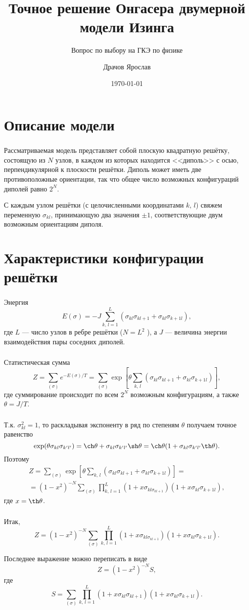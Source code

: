 \documentclass[c]{beamer}
\title{Точное решение Онгасера двумерной модели Изинга}
\subtitle{Вопрос по выбору на ГКЭ по физике}
\author{Драчов Ярослав}
\date{\today}
\institute[МФТИ]{Московский физико-технический институт}
\begin{document}
\frame[plain]{\titlepage}
\section{Описание модели}
\begin{frame}
\frametitle{\insertsection}
Рассматриваемая модель представляет собой плоскую квадратную
решётку, состоящую из $N$ узлов, в каждом из которых находится
<<диполь>> с осью, перпендикулярной к плоскости решётки. Диполь
может иметь две противоположные ориентации, так что общее
число возможных конфигураций диполей равно $2^N$.

С каждым узлом решётки (с целочисленными координатами $k,\,l$)
свяжем переменную $\sigma_{kl}$, принимающую два значения
$\pm 1$, соответствующие двум возможным ориентациям диполя.
\end{frame}
\section{Характеристики конфигурации решётки}
\begin{frame}
\frametitle{\insertsection}
\begin{block}{Энергия}
\[
	E(\sigma)= -J \sum_{k,\,l=1}^{L} \left(\sigma_{kl}\sigma_{kl+1}
	+\sigma_{kl}\sigma_{k+1l}\right)
,\] 
где $L$ --- число узлов в ребре решётки ($N=L^2$ ), а $J$ ---
величина энергии взаимодействия пары соседних диполей.
\end{block}
\end{frame} 
\begin{frame}
\frametitle{\insertsection}
\begin{block}{Статистическая сумма}
\[
	Z= \sum_{(\sigma)}^{} e^{-E(\sigma) /T}=\sum_{(\sigma)}^{} 
	\exp \left[ \theta \sum_{k,\,l}^{} (\sigma_{kl}
	\sigma_{kl+1}+\sigma_{kl}\sigma_{k+1l})\right] 
,\] 
где суммирование происходит по всем $2^{N}$ возможным конфигурациям, а также $\theta=J /T$.
\end{block}
\end{frame}
\begin{frame}
\frametitle{\insertsection}
Т.\:к. $\sigma_{kl}^2=1$, то раскладывая экспоненту в ряд 
по степеням $\theta$ получаем
точное равенство
\[
	\exp(\theta \sigma_{kl}\sigma_{k'l'})=
	\ch \theta + \sigma_{kl}\sigma_{k'l'} \sh\theta=
	\ch \theta (1+ \sigma_{kl}\sigma_{k'l'} \th\theta)
.\] 
Поэтому
\begin{multline*}
	Z=\sum_{(\sigma)}^{} 
	\exp \left[ \theta \sum_{k,\,l}^{} (\sigma_{kl}
	\sigma_{kl+1}+\sigma_{kl}\sigma_{k+1l})\right] =\\=
	(1-x^2)^{-N}\sum_{(\sigma)}^{} \prod_{k,\,l=1}^{L}
	(1+x \sigma_{kl \sigma _{kl+1}})(1+x \sigma_{kl}\sigma_{
	k+1l})
,\end{multline*} 
где $x=\th\theta$.
\end{frame}
\begin{frame}
\frametitle{\insertsection}
Итак,
\[
	Z=
	(1-x^2)^{-N}\sum_{(\sigma)}^{} \prod_{k,\,l=1}^{L}
	(1+x \sigma_{kl \sigma _{kl+1}})(1+x \sigma_{kl}\sigma_{
	k+1l})
.\] 

Последнее выражение можно переписать в виде
	\[
		Z=(1-x^2)^{-N}S
,\]
где
\[
	S= \sum_{(\sigma)}^{} \prod_{k,\,l=1}^{L} (1+x \sigma_{kl}
	\sigma_{kl+1})(1+x \sigma_{kl} \sigma_{k+1l})
.\] 
\end{frame}
\end{document}
